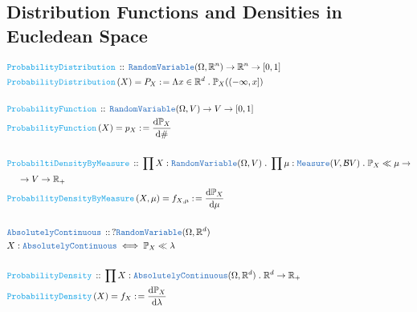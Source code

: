 \documentclass[12pt]{scrartcl}
\newcommand{\TYPE}[1]{\textcolor{NavyBlue}{\mathtt{#1}}}
\newcommand{\FUNC}[1]{\textcolor{Cerulean}{\mathtt{#1}}}
\renewcommand{\.}{\; . \;}
\newcommand{\de}{: \kern 0.1pc =}
\newcommand{\Act}[1]{\left( #1 \right)}
\newcommand{\DeclareType}[2]{& \TYPE{#1} \, :: \, #2 \\}
\newcommand{\DefineType}[3]{& #1 : \TYPE{#2} \iff #3 \\}
\newcommand{\DeclareFunc}[2]{& \FUNC{#1} \, :: \, #2 \\}
\newcommand{\DefineNamedFunc}[4]{&  \FUNC{#1}\Act{#2} = #3 \de #4 \\}
\newcommand{\NewLine}{\\ & \kern 1pc}
\newcommand{\Page}[1]{\begin{align*} #1 \end{align*}   }
\newcommand{\Reals}{\mathbb{R} }
\renewcommand{\AC}{\TYPE{AbsolutelyContinuous}}
\renewcommand{\O}{\Omega}
\newcommand{\B}{\mathcal{B}}
\renewcommand{\l}{\lambda}
\renewcommand{\P}{\mathbb{P}}
\newcommand{\RV}{\TYPE{RandomVariable}}
\begin{document}
\subsection{Distribution Functions and Densities in Eucledean Space }
\Page{
	\DeclareFunc{ProbabilityDistribution}{\RV(\O,\Reals^n) \to \Reals^n \to [0,1]}
	\DefineNamedFunc{ProbabilityDistribution}{X}{P_X}{\Lambda x \in \Reals^d \. \P_X((-\infty,x])}
	\\
	\DeclareFunc{ProbabilityFunction}{\RV(\O,V) \to V \to [0,1]}
	\DefineNamedFunc{ProbabilityFunction}{X}{p_X}{\frac{\mathrm{d}\P_X}{\mathrm{d}\#}}
	\\
	\DeclareFunc{ProbabiltiDensityByMeasure}{ \prod X : \RV(\O,V) \. \prod \mu :  \TYPE{Measure}(V,\B V) \. \P_X \ll \mu 
	\to \NewLine 
	\to V \to \Reals_+ }
	\DefineNamedFunc{ProbabilityDensityByMeasure}{ X,\mu }{f_{X,\mu}}{ \frac{\mathrm{d} \P_X}{\mathrm{d}\mu} }
	\\
	\DeclareType{\AC}{?\RV(\O,\Reals^d)}
	\DefineType{X}{\AC}{\P_X \ll \l}
	\\
	\DeclareFunc{ProbabilityDensity}{\prod X : \AC(\O,\Reals^d) \. \Reals^d \to \Reals_{+} }
	\DefineNamedFunc{ProbabilityDensity}{X}{f_X}{\frac{\mathrm{d}\P_X}{\mathrm{d}\l}}
}
\end{document}
